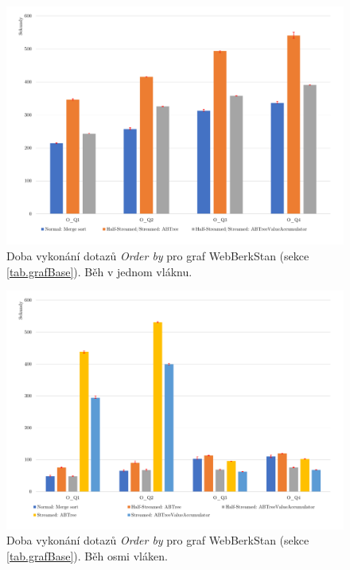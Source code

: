 \begin{figure}[!htp]
\includegraphics[width=\linewidth]{../img/webberkstanOrderByST.pdf}\centering
\caption{Doba vykonání dotazů \textit{Order by} pro graf WebBerkStan (sekce \ref{tab.grafBase}). Běh v jednom vláknu.}
\label{figure.webberkstanOrderST}
\end{figure}
\begin{figure}[!htp]
\includegraphics[width=\linewidth]{../img/webberkstanOrderByPar.pdf}\centering
\caption{Doba vykonání dotazů \textit{Order by} pro graf WebBerkStan (sekce \ref{tab.grafBase}).  Běh osmi vláken.}
\label{figure.webberkstanOrderPar}
\end{figure}

\clearpage

